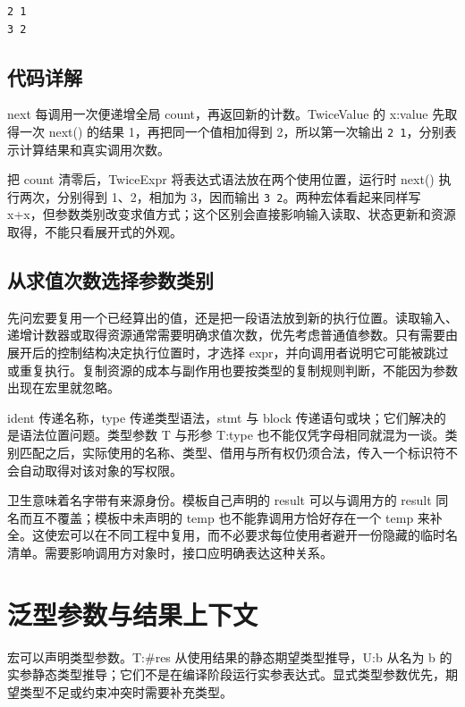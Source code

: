 \par
\medskip
\begin{lstlisting}[style=out]
2 1
3 2
\end{lstlisting}
\par
\medskip

\subsection*{代码详解}

next 每调用一次便递增全局 count，再返回新的计数。TwiceValue 的 x:value 先取得一次 next() 的结果 1，再把同一个值相加得到 2，所以第一次输出 \texttt{2 1}，分别表示计算结果和真实调用次数。

把 count 清零后，TwiceExpr 将表达式语法放在两个使用位置，运行时 next() 执行两次，分别得到 1、2，相加为 3，因而输出 \texttt{3 2}。两种宏体看起来同样写 x+x，但参数类别改变求值方式；这个区别会直接影响输入读取、状态更新和资源取得，不能只看展开式的外观。

\subsection*{从求值次数选择参数类别}

先问宏要复用一个已经算出的值，还是把一段语法放到新的执行位置。读取输入、递增计数器或取得资源通常需要明确求值次数，优先考虑普通值参数。只有需要由展开后的控制结构决定执行位置时，才选择 expr，并向调用者说明它可能被跳过或重复执行。复制资源的成本与副作用也要按类型的复制规则判断，不能因为参数出现在宏里就忽略。

ident 传递名称，type 传递类型语法，stmt 与 block 传递语句或块；它们解决的是语法位置问题。类型参数 T 与形参 T:type 也不能仅凭字母相同就混为一谈。类别匹配之后，实际使用的名称、类型、借用与所有权仍须合法，传入一个标识符不会自动取得对该对象的写权限。

卫生意味着名字带有来源身份。模板自己声明的 result 可以与调用方的 result 同名而互不覆盖；模板中未声明的 temp 也不能靠调用方恰好存在一个 temp 来补全。这使宏可以在不同工程中复用，而不必要求每位使用者避开一份隐藏的临时名清单。需要影响调用方对象时，接口应明确表达这种关系。

\section{泛型参数与结果上下文}

宏可以声明类型参数。T:\#res 从使用结果的静态期望类型推导，U:b 从名为 b 的实参静态类型推导；它们不是在编译阶段运行实参表达式。显式类型参数优先，期望类型不足或约束冲突时需要补充类型。

